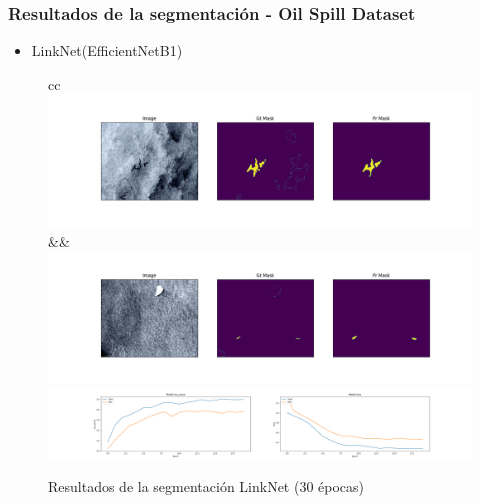 \begin{frame}
\frametitle{Resultados de la segmentación - Oil Spill Dataset}
\begin{itemize}
    \item LinkNet(EfficientNetB1)
\end{itemize}

\begin{figure}
    \centering
    \begin{tabular}{cc}
         \includegraphics[scale=0.15]{img/section_06/linknet_efficientnetb1_resultado_01.png}&&
         \includegraphics[scale=0.15]{img/section_06/linknet_efficientnetb1_resultado_02.png}\\
         \includegraphics[scale=0.12]{img/section_06/linknet_efficientnetb1_training_results.png}
    \end{tabular}
    \caption{Resultados de la segmentación LinkNet (30 épocas)}
    \label{fig:my_label}
\end{figure}
\end{frame}

